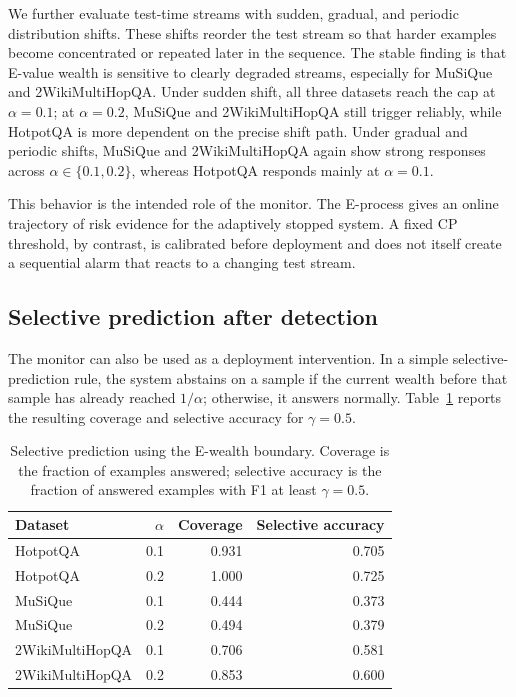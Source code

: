 \documentclass{article}
\newcommand{\hotpot}{HotpotQA}
\newcommand{\musique}{MuSiQue}
\newcommand{\twowiki}{2WikiMultiHopQA}
\begin{document}
We further evaluate test-time streams with sudden, gradual, and periodic distribution shifts. These shifts reorder the test stream so that harder examples become concentrated or repeated later in the sequence. The stable finding is that E-value wealth is sensitive to clearly degraded streams, especially for \musique{} and \twowiki{}. Under sudden shift, all three datasets reach the cap at $\alpha=0.1$; at $\alpha=0.2$, \musique{} and \twowiki{} still trigger reliably, while \hotpot{} is more dependent on the precise shift path. Under gradual and periodic shifts, \musique{} and \twowiki{} again show strong responses across $\alpha\in\{0.1,0.2\}$, whereas \hotpot{} responds mainly at $\alpha=0.1$.

This behavior is the intended role of the monitor. The E-process gives an online trajectory of risk evidence for the adaptively stopped system. A fixed CP threshold, by contrast, is calibrated before deployment and does not itself create a sequential alarm that reacts to a changing test stream.

\subsection{Selective prediction after detection}
\label{sec:selective}

The monitor can also be used as a deployment intervention. In a simple selective-prediction rule, the system abstains on a sample if the current wealth before that sample has already reached $1/\alpha$; otherwise, it answers normally. Table~\ref{tab:selective} reports the resulting coverage and selective accuracy for $\gamma=0.5$.

\begin{table}[t]
  \caption{Selective prediction using the E-wealth boundary. Coverage is the fraction of examples answered; selective accuracy is the fraction of answered examples with F1 at least $\gamma=0.5$.}
  \label{tab:selective}
  \centering
  \small
  \begin{tabular}{lrrr}
    \toprule
    Dataset & $\alpha$ & Coverage & Selective accuracy \\
    \midrule
    \hotpot{} & 0.1 & 0.931 & 0.705 \\
    \hotpot{} & 0.2 & 1.000 & 0.725 \\
    \musique{} & 0.1 & 0.444 & 0.373 \\
    \musique{} & 0.2 & 0.494 & 0.379 \\
    \twowiki{} & 0.1 & 0.706 & 0.581 \\
    \twowiki{} & 0.2 & 0.853 & 0.600 \\
    \bottomrule
  \end{tabular}
\end{table}
\end{document}
